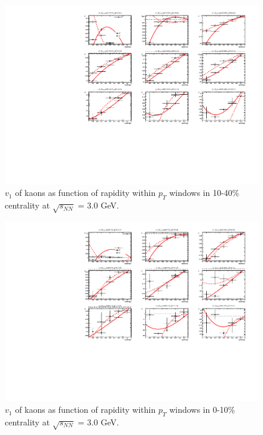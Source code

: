 \begin{figure}[hbt!]
\centering
\includegraphics[width=0.85\linewidth]{figures/chapter03/3gev_kaonp_v1VSy_9pT_cent1.pdf}
\caption{$v_1$ of kaons as function of rapidity within $p_T$ windows in 10-40\% centrality at $\sqrt{s_{NN}}$ = 3.0 GeV.}
\label{fig:3gev_kaon_v1y_pt_cent1}
\end{figure}
            
\begin{figure}[hbt!]
\centering
\includegraphics[width=0.85\linewidth]{figures/chapter03/3gev_kaonp_v1VSy_9pT_cent2.pdf}
\caption{$v_1$ of kaons as function of rapidity within $p_T$ windows in 0-10\% centrality at $\sqrt{s_{NN}}$ = 3.0 GeV.}
\label{fig:3gev_kaon_v1y_pt_cent2}
\end{figure}


